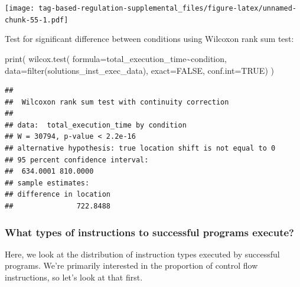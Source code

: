 \documentclass[
]{book}
\newenvironment{Shaded}{\begin{snugshade}}{\end{snugshade}}
\newcommand{\AttributeTok}[1]{\textcolor[rgb]{0.77,0.63,0.00}{#1}}
\newcommand{\ConstantTok}[1]{\textcolor[rgb]{0.00,0.00,0.00}{#1}}
\newcommand{\FunctionTok}[1]{\textcolor[rgb]{0.00,0.00,0.00}{#1}}
\newcommand{\NormalTok}[1]{#1}
\newcommand{\SpecialCharTok}[1]{\textcolor[rgb]{0.00,0.00,0.00}{#1}}
\begin{document}
\texttt{[image: tag-based-regulation-supplemental\_files/figure-latex/unnamed-chunk-55-1.pdf]}

Test for significant difference between conditions using Wilcoxon rank sum test:

\begin{Shaded}
\begin{Highlighting}[]
\FunctionTok{print}\NormalTok{(}
  \FunctionTok{wilcox.test}\NormalTok{(}
    \AttributeTok{formula=}\NormalTok{total\_execution\_time}\SpecialCharTok{\textasciitilde{}}\NormalTok{condition,}
    \AttributeTok{data=}\FunctionTok{filter}\NormalTok{(solutions\_inst\_exec\_data),}
    \AttributeTok{exact=}\ConstantTok{FALSE}\NormalTok{,}
    \AttributeTok{conf.int=}\ConstantTok{TRUE}\NormalTok{)}
\NormalTok{)}
\end{Highlighting}
\end{Shaded}

\begin{verbatim}
## 
##  Wilcoxon rank sum test with continuity correction
## 
## data:  total_execution_time by condition
## W = 30794, p-value < 2.2e-16
## alternative hypothesis: true location shift is not equal to 0
## 95 percent confidence interval:
##  634.0001 810.0000
## sample estimates:
## difference in location 
##               722.8488
\end{verbatim}

\hypertarget{what-types-of-instructions-to-successful-programs-execute}{%
\subsubsection{What types of instructions to successful programs execute?}\label{what-types-of-instructions-to-successful-programs-execute}}

Here, we look at the distribution of instruction types executed by successful programs.
We're primarily interested in the proportion of control flow instructions, so let's look at that first.
\end{document}
